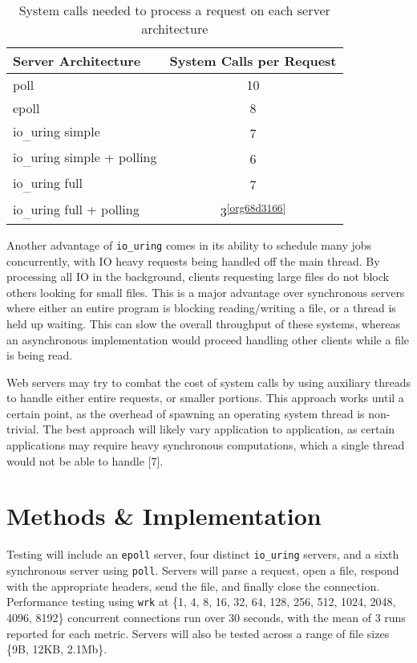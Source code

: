 \documentclass[conference]{IEEEtran}{}
\makeatletter
\newcommand{\cslcitation}[2]
 {\protect\hyper@linkstart{cite}{citeproc_bib_item_#1}#2\hyper@linkend}
\makeatother
\begin{document}
\begin{table}[htbp]
\caption{System calls needed to process a request on each server architecture}
\centering
\begin{tabular}{|l|c|}
Server Architecture & System Calls per Request\\
\hline
poll & 10\\
epoll & 8\\
io\textsubscript{\_}uring simple & 7\\
io\textsubscript{\_}uring simple + polling & 6\\
io\textsubscript{\_}uring full & 7\\
io\textsubscript{\_}uring full + polling & 3\textsuperscript{\ref{org68d3166}}\\
\end{tabular}
\end{table}

Another advantage of \texttt{io\_uring} comes in its ability to schedule many jobs concurrently, with IO heavy requests being handled off the main thread. By processing all IO in the background, clients requesting large files do not block others looking for small files. This is a major advantage over synchronous servers where either an entire program is blocking reading/writing a file, or a thread is held up waiting. This can slow the overall throughput of these systems, whereas an asynchronous implementation would proceed handling other clients while a file is being read.

Web servers may try to combat the cost of system calls by using auxiliary threads to handle either entire requests, or smaller portions. This approach works until a certain point, as the overhead of spawning an operating system thread is non-trivial. The best approach will likely vary application to application, as certain applications may require heavy synchronous computations, which a single thread would not be able to handle \cslcitation{7}{[7]}.
\section{Methods \& Implementation}
\label{sec:org76955c8}
Testing will include an \texttt{epoll} server, four distinct \texttt{io\_uring} servers, and a sixth synchronous server using \texttt{poll}. Servers will parse a request, open a file, respond with the appropriate headers, send the file, and finally close the connection. Performance testing using \texttt{wrk} at \{1, 4, 8, 16, 32, 64, 128, 256, 512, 1024, 2048, 4096, 8192\} concurrent connections run over 30 seconds, with the mean of 3 runs reported for each metric. Servers will also be tested across a range of file sizes \{9B, 12KB, 2.1Mb\}.
\end{document}
